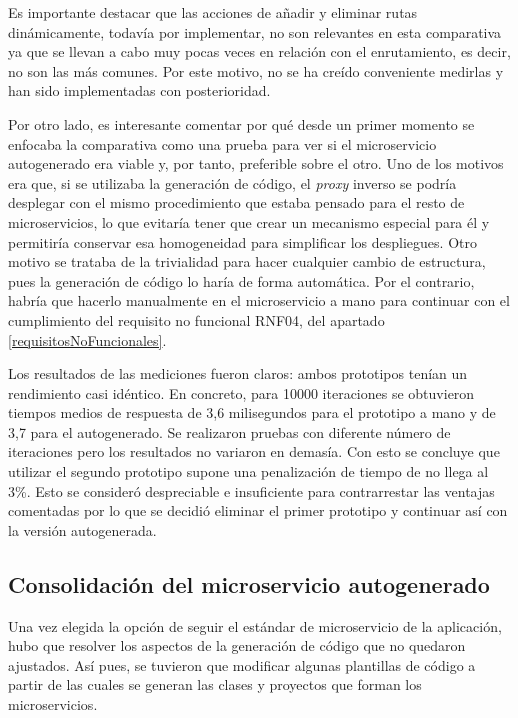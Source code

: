 \documentclass[11pt,spanish,listoffigures]{tfgetsinf}
\begin{document}
Es importante destacar que las acciones de añadir y eliminar rutas dinámicamente, todavía por implementar, no son relevantes en esta comparativa ya que se llevan a cabo muy pocas veces en relación con el enrutamiento, es decir, no son las más comunes. Por este motivo, no se ha creído conveniente medirlas y han sido implementadas con posterioridad.

Por otro lado, es interesante comentar por qué desde un primer momento se enfocaba la comparativa como una prueba para ver si el microservicio autogenerado era viable y, por tanto, preferible sobre el otro. Uno de los motivos era que, si se utilizaba la generación de código, el \emph{proxy} inverso se podría desplegar con el mismo procedimiento que estaba pensado para el resto de microservicios, lo que evitaría tener que crear un mecanismo especial para él y permitiría conservar esa homogeneidad para simplificar los despliegues. Otro motivo se trataba de la trivialidad para hacer cualquier cambio de estructura, pues la generación de código lo haría de forma automática. Por el contrario, habría que hacerlo manualmente en el microservicio a mano para continuar con el cumplimiento del requisito no funcional RNF04, del apartado \ref{requisitosNoFuncionales}.

Los resultados de las mediciones fueron claros: ambos prototipos tenían un rendimiento casi idéntico.
En concreto, para 10000 iteraciones se obtuvieron tiempos medios de respuesta de 3,6 milisegundos para el prototipo a mano y de 3,7 para el autogenerado. Se realizaron pruebas con diferente número de iteraciones pero los resultados no variaron en demasía. Con esto se concluye que utilizar el segundo prototipo supone una penalización de tiempo de no llega al 3\%. Esto se consideró despreciable e insuficiente para contrarrestar las ventajas comentadas por lo que se decidió eliminar el primer prototipo y continuar así con la versión autogenerada.


		\subsection{Consolidación del microservicio autogenerado}

Una vez elegida la opción de seguir el estándar de microservicio de la aplicación, hubo que resolver los aspectos de la generación de código que no quedaron ajustados. Así pues, se tuvieron que modificar algunas plantillas de código a partir de las cuales se generan las clases y proyectos que forman los microservicios.
\end{document}

